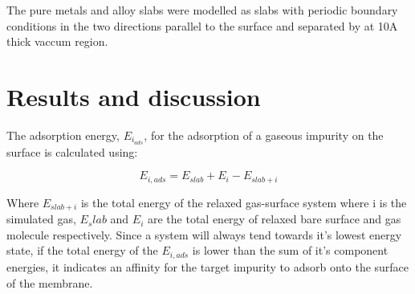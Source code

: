 The pure metals and alloy slabs were modelled as slabs with periodic boundary conditions in the two directions parallel to the surface and separated by at 10A thick vaccum region. 

\section{Results and discussion}
The adsorption energy, $E_{i_{ads}}$, for the adsorption of a gaseous impurity on the surface is calculated using:

\begin{equation}
    E_{i,ads} = E_{slab} + E_i - E_{slab + i}
\end{equation}

Where $E_{slab + i}$ is the total energy of the relaxed gas-surface system where i is the simulated gas, $E_slab$ and $E_i$ are the total energy of relaxed bare surface and gas molecule respectively. Since a system will always tend towards it's lowest energy state, if the total energy of the $E_{i,ads}$ is lower than the sum of it's component energies, it indicates an affinity for the target impurity to adsorb onto the surface of the membrane.

